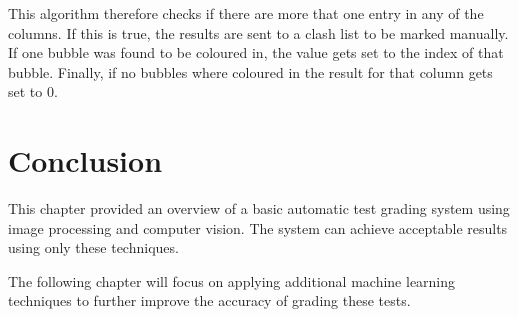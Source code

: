 This algorithm therefore checks if there are more that one entry in any of the columns. If this is true, the results are sent to a clash list to be marked manually. If one bubble was found to be coloured in, the value gets set to the index of that bubble. Finally, if no bubbles where coloured in the result for that column gets set to 0.

\section{Conclusion}

This chapter provided an overview of a basic automatic test grading system using image processing and computer vision. The system can achieve acceptable results using only these techniques.

The following chapter will focus on applying additional machine learning techniques to further improve the accuracy of grading these tests.